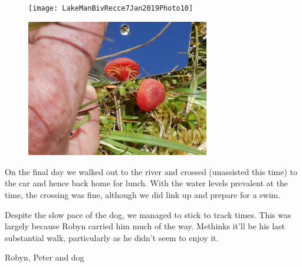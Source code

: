 \documentclass[12pt]{article} %
\begin{document}
\begin{figure}[ht]
\begin{minipage}{.5\linewidth}
\begin{flushleft}
   \texttt{[image: LakeManBivRecce7Jan2019Photo10]}
\end{flushleft}
\end{minipage}
\begin{minipage}{.5\linewidth}
\begin{flushright}
   \includegraphics[width=8cm]{LakeManBivRecce7Jan2019Photo11}
\end{flushright}
\end{minipage}
\end{figure}

On the final day we walked out to the river and crossed (unassisted this time) to the car and hence back home for lunch.  With the water levels prevalent at the time, the crossing was fine, although we did link up and prepare for a swim.

Despite the slow pace of the dog, we managed to stick to track times.  This was largely because Robyn carried him much of the way.  Methinks it'll be his last substantial walk, particularly as he didn't seem to enjoy it.

\begin{flushright}
Robyn, Peter and dog
\end{flushright}
\end{document}
